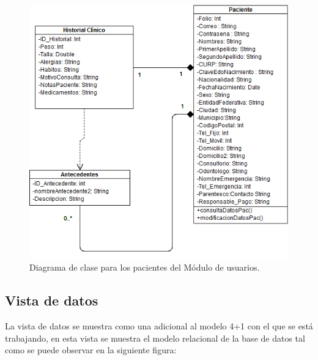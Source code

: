 \begin{figure}[H]
\centering
\includegraphics[width=16cm,keepaspectratio]{pictures/DiagramaClases_Paciente_Prototipo1.png}
\caption{Diagrama de clase para los pacientes del Módulo de usuarios.}
\end{figure}


\newpage
\subsection{Vista de datos}
La vista de datos se muestra como una adicional al modelo 4+1 con el que se está trabajando, en esta vista se muestra el modelo relacional de la base de datos tal como se puede observar en la siguiente figura:

